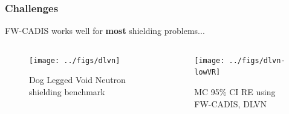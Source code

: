 \documentclass[xcolor=x11names,compress, handout]{beamer}
\renewcommand{\(}{\begin{columns}}
\renewcommand{\)}{\end{columns}}
\newcommand{\<}[1]{\begin{column}{#1}}
\renewcommand{\>}{\end{column}}
\begin{document}
\begin{frame}[fragile]
  \frametitle{Challenges}

	FW-CADIS works well for \textbf{most} shielding problems...
	\begin{columns}
  	\begin{column}{0.5\textwidth}
  	\begin{figure}
  	\begin{center}
  		\texttt{[image: ../figs/dlvn]}
		\caption{Dog Legged Void Neutron shielding benchmark}
	\end{center}
  	\end{figure}
  	\end{column}
 	\begin{column}{0.5\textwidth}
 	\begin{figure}
  	\begin{center}
  		\texttt{[image: ../figs/dlvn-lowVR]}
  		\caption{MC 95\% CI RE using FW-CADIS, DLVN \cite{Slaybaugh2013}}
  	\end{center}
  	\end{figure}
  	\end{column}
	\end{columns}
  
\end{frame}
\end{document}
